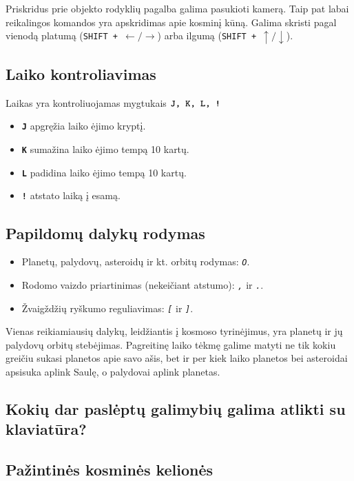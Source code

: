 \documentclass[a4paper]{article}
\begin{document}
Priskridus prie objekto rodyklių pagalba galima pasukioti kamerą. Taip pat labai reikalingos komandos yra apskridimas apie kosminį kūną. Galima skristi pagal vienodą platumą (\texttt{SHIFT + $\leftarrow / \rightarrow$}) arba ilgumą (\texttt{SHIFT + $\uparrow / \downarrow$}).

\subsection*{Laiko kontroliavimas}
 
Laikas yra kontroliuojamas mygtukais $\textbf{\texttt{J, K, L, !}}$

\begin{itemize}
\item \textbf{\texttt{J}} apgręžia laiko ėjimo kryptį.
\item \textbf{\texttt{K}} sumažina laiko ėjimo tempą 10 kartų.
\item \textbf{\texttt{L}} padidina laiko ėjimo tempą 10 kartų.
\item \textbf{\texttt{!}} atstato laiką į esamą.
\end{itemize}

\subsection*{Papildomų dalykų rodymas}
\begin{itemize}
\item Planetų, palydovų, asteroidų ir kt. orbitų rodymas: \texttt{\textit{O}}.
\item Rodomo vaizdo priartinimas (nekeičiant atstumo): \texttt{\textit{,}} ir \texttt{\textit{.}}.
\item Žvaigždžių ryškumo reguliavimas: \texttt{\textit{[}} ir \texttt{\textit{]}}.
\end{itemize}

Vienas reikiamiausių dalykų, leidžiantis į kosmoso tyrinėjimus, yra planetų ir jų palydovų orbitų stebėjimas. Pagreitinę laiko tėkmę galime matyti ne tik kokiu greičiu sukasi planetos apie savo ašis, bet ir per kiek laiko planetos bei asteroidai apsisuka aplink Saulę, o palydovai aplink planetas.

\subsection*{Kokių dar paslėptų galimybių galima atlikti su klaviatūra?}

 \subsection{Pažintinės kosminės kelionės}
 
\end{document}
